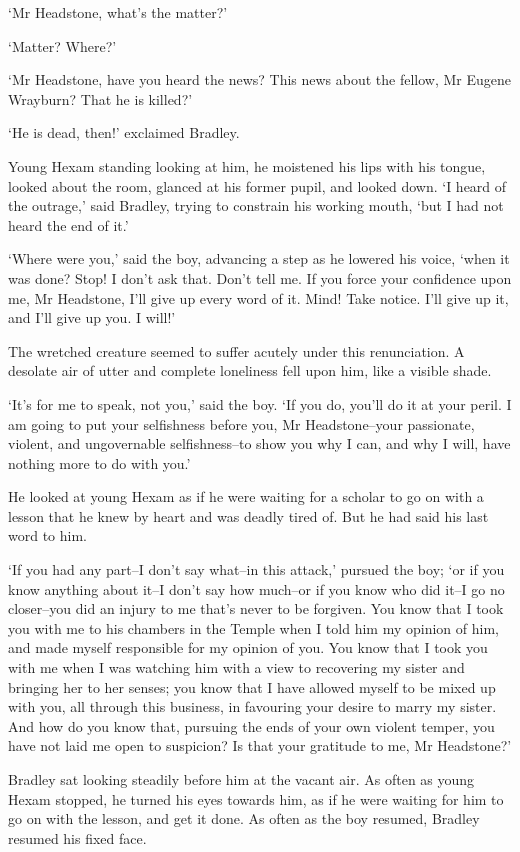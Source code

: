 ‘Mr Headstone, what’s the matter?’

‘Matter? Where?’

‘Mr Headstone, have you heard the news? This news about the fellow, Mr
Eugene Wrayburn? That he is killed?’

‘He is dead, then!’ exclaimed Bradley.

Young Hexam standing looking at him, he moistened his lips with his
tongue, looked about the room, glanced at his former pupil, and looked
down. ‘I heard of the outrage,’ said Bradley, trying to constrain his
working mouth, ‘but I had not heard the end of it.’

‘Where were you,’ said the boy, advancing a step as he lowered his
voice, ‘when it was done? Stop! I don’t ask that. Don’t tell me. If you
force your confidence upon me, Mr Headstone, I’ll give up every word of
it. Mind! Take notice. I’ll give up it, and I’ll give up you. I will!’

The wretched creature seemed to suffer acutely under this renunciation.
A desolate air of utter and complete loneliness fell upon him, like a
visible shade.

‘It’s for me to speak, not you,’ said the boy. ‘If you do, you’ll do
it at your peril. I am going to put your selfishness before you, Mr
Headstone--your passionate, violent, and ungovernable selfishness--to
show you why I can, and why I will, have nothing more to do with you.’

He looked at young Hexam as if he were waiting for a scholar to go on
with a lesson that he knew by heart and was deadly tired of. But he had
said his last word to him.

‘If you had any part--I don’t say what--in this attack,’ pursued the
boy; ‘or if you know anything about it--I don’t say how much--or if you
know who did it--I go no closer--you did an injury to me that’s never
to be forgiven. You know that I took you with me to his chambers in the
Temple when I told him my opinion of him, and made myself responsible
for my opinion of you. You know that I took you with me when I was
watching him with a view to recovering my sister and bringing her to her
senses; you know that I have allowed myself to be mixed up with you, all
through this business, in favouring your desire to marry my sister. And
how do you know that, pursuing the ends of your own violent temper, you
have not laid me open to suspicion? Is that your gratitude to me, Mr
Headstone?’

Bradley sat looking steadily before him at the vacant air. As often
as young Hexam stopped, he turned his eyes towards him, as if he were
waiting for him to go on with the lesson, and get it done. As often as
the boy resumed, Bradley resumed his fixed face.

